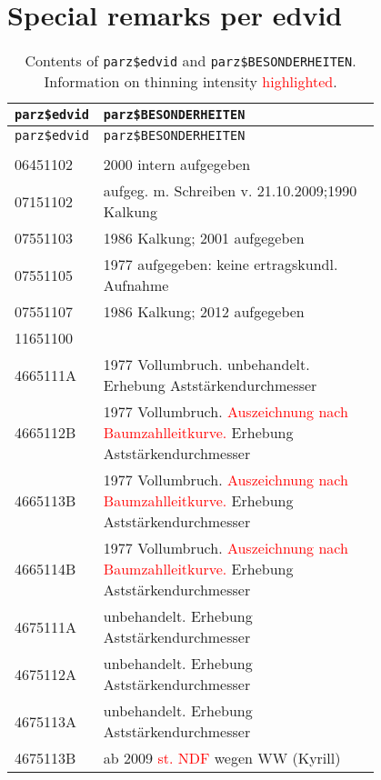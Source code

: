\section{Special remarks per edvid}

\begin{singlespace}
  {\tabulinesep=2mm
    \begin{longtabu}{l p{0.8\linewidth}}
      \caption{Contents of \texttt{parz\$edvid} and \texttt{parz\$BESONDERHEITEN}.  Information on thinning intensity \textcolor{red}{highlighted}. \label{tab:special_remarks}} \\
      \toprule
      \texttt{parz\$edvid} & \texttt{parz\$BESONDERHEITEN} \\
      \midrule
      \endfirsthead
      \texttt{parz\$edvid} & \texttt{parz\$BESONDERHEITEN} \\
      \midrule
      \endhead
      \bottomrule
       & \\
      06451102 & 2000  intern aufgegeben \\
      07151102 & aufgeg. m. Schreiben v. 21.10.2009;1990 Kalkung \\
      07551103 & 1986 Kalkung; 2001 aufgegeben \\
      07551105 & 1977 aufgegeben:  keine ertragskundl. Aufnahme \\
      07551107 & 1986 Kalkung; 2012 aufgegeben \\
      11651100 & \\
      4665111A & 1977 Vollumbruch. unbehandelt. Erhebung Aststärkendurchmesser \\
      4665112B & 1977 Vollumbruch. \textcolor{red}{Auszeichnung nach Baumzahlleitkurve.} Erhebung Aststärkendurchmesser \\
      4665113B & 1977 Vollumbruch. \textcolor{red}{Auszeichnung nach Baumzahlleitkurve.} Erhebung Aststärkendurchmesser \\
      4665114B & 1977 Vollumbruch. \textcolor{red}{Auszeichnung nach Baumzahlleitkurve.} Erhebung Aststärkendurchmesser \\
      4675111A & unbehandelt. Erhebung Aststärkendurchmesser \\
      4675112A & unbehandelt. Erhebung Aststärkendurchmesser \\
      4675113A & unbehandelt. Erhebung Aststärkendurchmesser \\
      4675113B & ab 2009 \textcolor{red}{st. NDF} wegen WW (Kyrill) \\

\end{longtabu}}
\end{singlespace}
